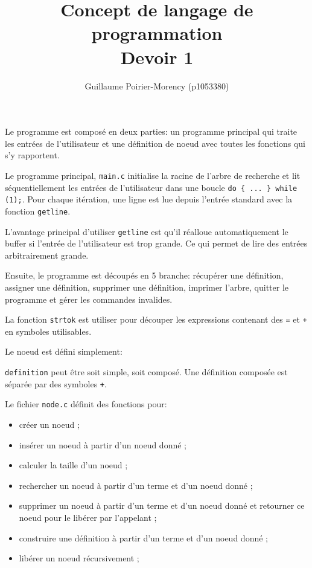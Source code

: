\documentclass{article}
\title{Concept de langage de programmation \\ Devoir 1}
\author{Guillaume Poirier-Morency (p1053380)}
\begin{document}
\maketitle

\section{}
Le programme est composé en deux parties: un programme principal qui traite les
entrées de l'utilisateur et une définition de noeud avec toutes les fonctions
qui s'y rapportent.

Le programme principal, \texttt{main.c} initialise la racine de l'arbre de
recherche et lit séquentiellement les entrées de l'utilisateur dans une boucle
\texttt{do \{ ... \} while (1);}. Pour chaque itération, une ligne est lue
depuis l'entrée standard avec la fonction \texttt{getline}.

L'avantage principal d'utiliser \texttt{getline} est qu'il réalloue
automatiquement le buffer si l'entrée de l'utilisateur est trop grande. Ce qui
permet de lire des entrées arbitrairement grande.

Ensuite, le programme est découpés en 5 branche: récupérer une définition,
assigner une définition, supprimer une définition, imprimer l'arbre, quitter le
programme et gérer les commandes invalides.

La fonction \texttt{strtok} est utiliser pour découper les expressions contenant
des \texttt{=} et \texttt{+} en symboles utilisables.

Le noeud est défini simplement:


\texttt{definition} peut être soit simple, soit composé. Une définition composée
est séparée par des symboles \texttt{+}.

Le fichier \texttt{node.c} définit des fonctions pour:
\begin{itemize}
\item créer un noeud ;
\item insérer un noeud à partir d'un noeud donné ;
\item calculer la taille d'un noeud ;
\item rechercher un noeud à partir d'un terme et d'un noeud donné ;
\item supprimer un noeud à partir d'un terme et d'un noeud donné et retourner ce
noeud pour le libérer par l'appelant ;
\item construire une définition à partir d'un terme et d'un noeud donné ;
\item libérer un noeud récursivement ;
\end{itemize}
\end{document}
